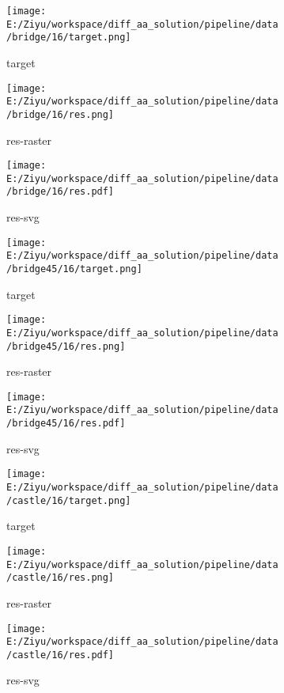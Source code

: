 \documentclass{article}%
\begin{document}
\begin{figure}[H]%
\begin{subfigure}[b]{0.32\linewidth}%
\texttt{[image: E:/Ziyu/workspace/diff\_aa\_solution/pipeline/data/bridge/16/target.png]}%
\caption{target}%
\end{subfigure}%
\begin{subfigure}[b]{0.32\linewidth}%
\texttt{[image: E:/Ziyu/workspace/diff\_aa\_solution/pipeline/data/bridge/16/res.png]}%
\caption{res{-}raster}%
\end{subfigure}%
\begin{subfigure}[b]{0.32\linewidth}%
\texttt{[image: E:/Ziyu/workspace/diff\_aa\_solution/pipeline/data/bridge/16/res.pdf]}%
\caption{res{-}svg}%
\end{subfigure}%
\par\vspace{1em}%
\caption{}%
\clearpage%
\end{figure}

%


\begin{figure}[H]%
\begin{subfigure}[b]{0.32\linewidth}%
\texttt{[image: E:/Ziyu/workspace/diff\_aa\_solution/pipeline/data/bridge45/16/target.png]}%
\caption{target}%
\end{subfigure}%
\begin{subfigure}[b]{0.32\linewidth}%
\texttt{[image: E:/Ziyu/workspace/diff\_aa\_solution/pipeline/data/bridge45/16/res.png]}%
\caption{res{-}raster}%
\end{subfigure}%
\begin{subfigure}[b]{0.32\linewidth}%
\texttt{[image: E:/Ziyu/workspace/diff\_aa\_solution/pipeline/data/bridge45/16/res.pdf]}%
\caption{res{-}svg}%
\end{subfigure}%
\par\vspace{1em}%
\caption{}%
\end{figure}

%


\begin{figure}[H]%
\begin{subfigure}[b]{0.32\linewidth}%
\texttt{[image: E:/Ziyu/workspace/diff\_aa\_solution/pipeline/data/castle/16/target.png]}%
\caption{target}%
\end{subfigure}%
\begin{subfigure}[b]{0.32\linewidth}%
\texttt{[image: E:/Ziyu/workspace/diff\_aa\_solution/pipeline/data/castle/16/res.png]}%
\caption{res{-}raster}%
\end{subfigure}%
\begin{subfigure}[b]{0.32\linewidth}%
\texttt{[image: E:/Ziyu/workspace/diff\_aa\_solution/pipeline/data/castle/16/res.pdf]}%
\caption{res{-}svg}%
\end{subfigure}%
\par\vspace{1em}%
\caption{}%
\end{figure}
\end{document}
